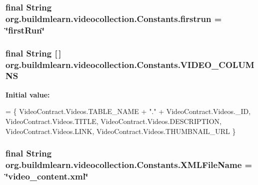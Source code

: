 \subsubsection[{\texorpdfstring{firstrun}{firstrun}}]{\setlength{\rightskip}{0pt plus 5cm}final String org.\+buildmlearn.\+videocollection.\+Constants.\+firstrun = \char`\"{}first\+Run\char`\"{}\hspace{0.3cm}{\ttfamily [static]}}\hypertarget{classorg_1_1buildmlearn_1_1videocollection_1_1Constants_af17a03dffa6325ff454d262e84084259}{}\label{classorg_1_1buildmlearn_1_1videocollection_1_1Constants_af17a03dffa6325ff454d262e84084259}
\subsubsection[{\texorpdfstring{V\+I\+D\+E\+O\+\_\+\+C\+O\+L\+U\+M\+NS}{VIDEO_COLUMNS}}]{\setlength{\rightskip}{0pt plus 5cm}final String \mbox{[}$\,$\mbox{]} org.\+buildmlearn.\+videocollection.\+Constants.\+V\+I\+D\+E\+O\+\_\+\+C\+O\+L\+U\+M\+NS\hspace{0.3cm}{\ttfamily [static]}}\hypertarget{classorg_1_1buildmlearn_1_1videocollection_1_1Constants_add550b0eba9669cf5ab4f1a7c479881e}{}\label{classorg_1_1buildmlearn_1_1videocollection_1_1Constants_add550b0eba9669cf5ab4f1a7c479881e}
{\bfseries Initial value\+:}
\begin{DoxyCode}
= \{
            VideoContract.Videos.TABLE\_NAME + \textcolor{stringliteral}{"."} + VideoContract.Videos.\_ID,
            VideoContract.Videos.TITLE,
            VideoContract.Videos.DESCRIPTION,
            VideoContract.Videos.LINK,
            VideoContract.Videos.THUMBNAIL\_URL
    \}
\end{DoxyCode}
\subsubsection[{\texorpdfstring{X\+M\+L\+File\+Name}{XMLFileName}}]{\setlength{\rightskip}{0pt plus 5cm}final String org.\+buildmlearn.\+videocollection.\+Constants.\+X\+M\+L\+File\+Name = \char`\"{}video\+\_\+content.\+xml\char`\"{}\hspace{0.3cm}{\ttfamily [static]}}\hypertarget{classorg_1_1buildmlearn_1_1videocollection_1_1Constants_a868f215414c7df72f4155d1a69d2a79a}{}\label{classorg_1_1buildmlearn_1_1videocollection_1_1Constants_a868f215414c7df72f4155d1a69d2a79a}


